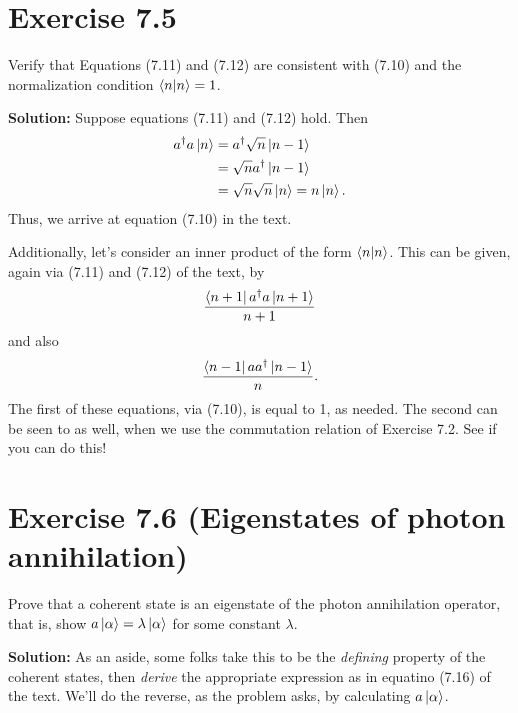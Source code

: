 \documentclass{book}
\begin{document}
\section*{Exercise 7.5}
    Verify that Equations (7.11) and (7.12) are consistent with (7.10) and the normalization condition $\bra{n}\ket{n} = 1$.

    \textbf{Solution:} Suppose equations (7.11) and (7.12) hold. Then
    \begin{align}
    \begin{aligned}
        a^\dagger a \ket{n} &= a^\dagger \sqrt{n}\ket{n-1} \\
        &= \sqrt{n} a^\dagger \ket{n-1} \\
        &= \sqrt{n} \sqrt{n} \ket{n} = n \ket{n}.
    \end{aligned}
    \end{align}
    Thus, we arrive at equation (7.10) in the text.
    
    Additionally, let's consider an inner product of the form $\bra{n}\ket{n}$. This can be given, again via (7.11) and (7.12) of the text, by
    \begin{align}
        \frac{\bra{n+1}a^\dagger a \ket{n+1}}{n+1}
    \end{align}
    and also 
    \begin{align}
        \frac{\bra{n-1}a a^\dagger \ket{n-1}}{n}.
    \end{align}
    The first of these equations, via (7.10), is equal to 1, as needed. The second can be seen to as well, when we use the commutation relation of Exercise 7.2. See if you can do this!

\section*{Exercise 7.6 (Eigenstates of photon annihilation)}
    Prove that a coherent state is an eigenstate of the photon annihilation operator, that is, show $a\ket{\alpha} = \lambda \ket{\alpha}$ for some constant $\lambda$.

    \textbf{Solution:} As an aside, some folks take this to be the \emph{defining} property of the coherent states, then \emph{derive} the appropriate expression as in equatino (7.16) of the text. We'll do the reverse, as the problem asks, by calculating $a\ket{\alpha}$.
\end{document}
